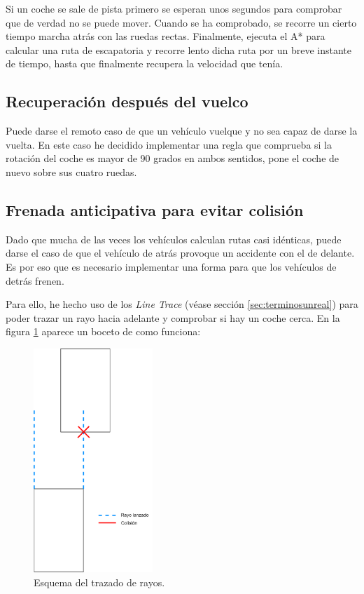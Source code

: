 Si un coche se sale de pista primero se esperan unos segundos para comprobar que de verdad no se puede mover. Cuando se ha comprobado, se recorre un cierto tiempo marcha atrás con las ruedas rectas. Finalmente, ejecuta el A* para calcular una ruta de escapatoria y recorre lento dicha ruta por un breve instante de tiempo, hasta que finalmente recupera la velocidad que tenía.

\subsection{Recuperación después del vuelco}

Puede darse el remoto caso de que un vehículo vuelque y no sea capaz de darse la vuelta. En este caso he decidido implementar una regla que comprueba si la rotación del coche es mayor de 90 grados en ambos sentidos, pone el coche de nuevo sobre sus cuatro ruedas.

\subsection{Frenada anticipativa para evitar colisión}
\label{sec:frenada}

Dado que mucha de las veces los vehículos calculan rutas casi idénticas, puede darse el caso de que el vehículo de atrás provoque un accidente con el de delante. Es por eso que es necesario implementar una forma para que los vehículos de detrás frenen.

\bigskip

Para ello, he hecho uso de los \textit{Line Trace} (véase sección \ref{sec:terminosunreal}) para poder trazar un rayo hacia adelante y comprobar si hay un coche cerca. En la figura \ref{fig:esqlinetrace} aparece un boceto de como funciona:

\begin{figure}[H]
    \centering
    \includegraphics[width=0.4\textwidth]{imagenes/raycast.png}
    \caption{Esquema del trazado de rayos.}
    \label{fig:esqlinetrace}
\end{figure}


